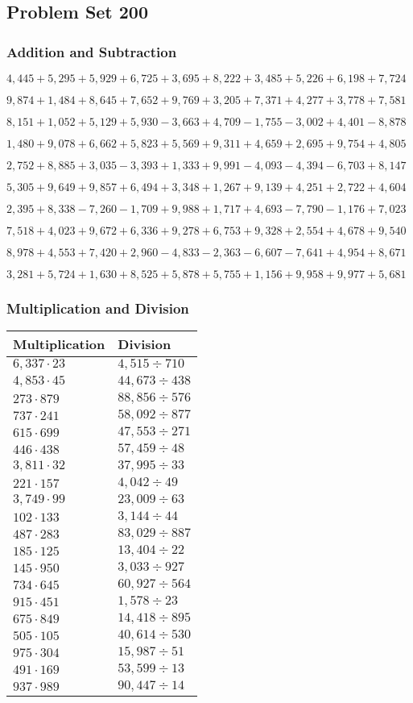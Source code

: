 \hypertarget{problem-set-200}{%
\subsection{Problem Set 200}\label{problem-set-200}}

\hypertarget{addition-and-subtraction}{%
\subsubsection{Addition and
Subtraction}\label{addition-and-subtraction}}

\(4,445+5,295+5,929+6,725+3,695+8,222+3,485+5,226+6,198+7,724\)

\(9,874+1,484+8,645+7,652+9,769+3,205+7,371+4,277+3,778+7,581\)

\(8,151+1,052+5,129+5,930-3,663+4,709-1,755-3,002+4,401-8,878\)

\(1,480+9,078+6,662+5,823+5,569+9,311+4,659+2,695+9,754+4,805\)

\(2,752+8,885+3,035-3,393+1,333+9,991-4,093-4,394-6,703+8,147\)

\(5,305+9,649+9,857+6,494+3,348+1,267+9,139+4,251+2,722+4,604\)

\(2,395+8,338-7,260-1,709+9,988+1,717+4,693-7,790-1,176+7,023\)

\(7,518+4,023+9,672+6,336+9,278+6,753+9,328+2,554+4,678+9,540\)

\(8,978+4,553+7,420+2,960-4,833-2,363-6,607-7,641+4,954+8,671\)

\(3,281+5,724+1,630+8,525+5,878+5,755+1,156+9,958+9,977+5,681\)

\hypertarget{multiplication-and-division}{%
\subsubsection{Multiplication and
Division}\label{multiplication-and-division}}

\begin{longtable}[]{@{}ll@{}}
\toprule
Multiplication & Division\tabularnewline
\midrule
\endhead
\(6,337\cdot23\) & \(4,515÷710\)\tabularnewline
\(4,853\cdot45\) & \(44,673÷438\)\tabularnewline
\(273\cdot879\) & \(88,856÷576\)\tabularnewline
\(737\cdot241\) & \(58,092÷877\)\tabularnewline
\(615\cdot699\) & \(47,553÷271\)\tabularnewline
\(446\cdot438\) & \(57,459÷48\)\tabularnewline
\(3,811\cdot32\) & \(37,995÷33\)\tabularnewline
\(221\cdot157\) & \(4,042÷49\)\tabularnewline
\(3,749\cdot99\) & \(23,009÷63\)\tabularnewline
\(102\cdot133\) & \(3,144÷44\)\tabularnewline
\(487\cdot283\) & \(83,029÷887\)\tabularnewline
\(185\cdot125\) & \(13,404÷22\)\tabularnewline
\(145\cdot950\) & \(3,033÷927\)\tabularnewline
\(734\cdot645\) & \(60,927÷564\)\tabularnewline
\(915\cdot451\) & \(1,578÷23\)\tabularnewline
\(675\cdot849\) & \(14,418÷895\)\tabularnewline
\(505\cdot105\) & \(40,614÷530\)\tabularnewline
\(975\cdot304\) & \(15,987÷51\)\tabularnewline
\(491\cdot169\) & \(53,599÷13\)\tabularnewline
\(937\cdot989\) & \(90,447÷14\)\tabularnewline
\bottomrule
\end{longtable}
